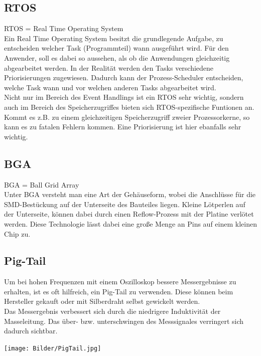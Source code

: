 \subsection{RTOS}
RTOS = Real Time Operating System
\\
Ein \glqq Real Time Operating System\grqq{} besitzt die grundlegende Aufgabe, zu entscheiden welcher Task (Programmteil) wann ausgeführt wird. Für den Anwender, soll es dabei so aussehen, als ob die Anwendungen gleichzeitig abgearbeitet werden. In der Realität werden den Tasks verschiedene Priorisierungen zugewiesen. Dadurch kann der Prozess-Scheduler entscheiden, welche Task wann und vor welchen anderen Tasks abgearbeitet wird. 
\\
Nicht nur im Bereich des \glqq Event Handlings \grqq{} ist ein RTOS sehr wichtig, sondern auch im Bereich des Speicherzugriffes bieten sich RTOS-spezifische Funtionen an. Kommt es z.B. zu einem gleichzeitigen Speicherzugriff zweier Prozessorkerne, so kann es zu fatalen Fehlern kommen. Eine Priorisierung ist hier ebanfalls sehr wichtig.

\newpage
\subsection{BGA}
BGA = Ball Grid Array
\\
Unter \glqq BGA\grqq{} versteht man eine Art der Gehäuseform, wobei die Anschlüsse für die SMD-Bestückung auf der Unterseite des Bauteiles liegen. Kleine Lötperlen auf der Unterseite, können dabei durch einen Reflow-Prozess mit der Platine verlötet werden. Diese Technologie lässt dabei eine große Menge an Pins auf einem kleinen Chip zu. 


\subsection{Pig-Tail}
Um bei hohen Frequenzen mit einem Oszilloskop bessere Messergebnisse zu erhalten, ist es oft hilfreich, ein Pig-Tail zu verwenden. Diese können beim Hersteller gekauft oder mit Silberdraht selbst gewickelt werden. 
\\
Das Messergebnis verbessert sich durch die niedrigere Induktivität der Masseleitung. Das über- bzw. unterschwingen des Messsignales verringert sich dadurch sichtbar. 


\begin{center}

\texttt{[image: Bilder/PigTail.jpg]}


\end{center}


